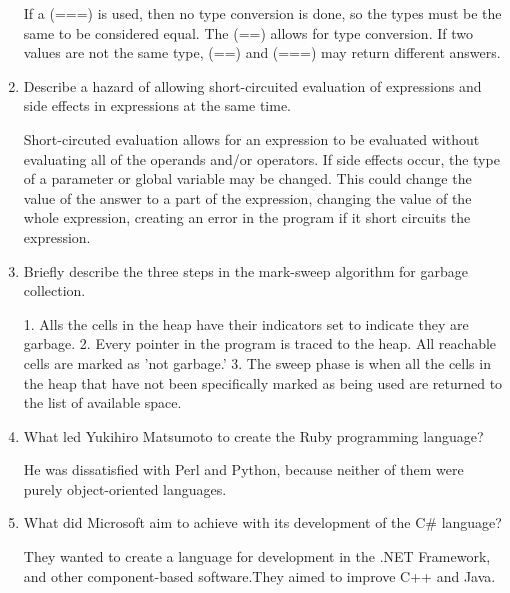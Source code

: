 \begin{enumerate}
  \begin{answer}

    If a (===) is used, then no type conversion is done, so the types
    must be the same to be considered equal. The (==) allows for type
    conversion. If two values are not the same type, (==) and (===)
    may return different answers.

    \end{answer}

  \item Describe a hazard of allowing short-circuited evaluation
    of expressions and side effects in expressions at the same time.

  \begin{answer}

    Short-circuted evaluation allows for an expression to be evaluated
    without evaluating all of the operands and/or operators. If side
    effects occur, the type of a parameter or global variable may be
    changed. This could change the value of the answer to a part of
    the expression, changing the value of the whole expression,
    creating an error in the program if it short circuits the
    expression.

    \end{answer}

  \item Briefly describe the three steps in the mark-sweep algorithm
    for garbage collection.

  \begin{answer}

    1. Alls the cells in the heap have their indicators set to
    indicate they are garbage.  2. Every pointer in the program is
    traced to the heap. All reachable cells are marked as 'not
    garbage.'  3. The sweep phase is when all the cells in the heap
    that have not been specifically marked as being used are returned
    to the list of available space.

    \end{answer}

  \item What led Yukihiro Matsumoto to create the Ruby programming language?

  \begin{answer}

    He was dissatisfied with Perl and Python, because neither of them
    were purely object-oriented languages.

    \end{answer}

  \item What did Microsoft aim to achieve with its development of the
    C\# language?

  \begin{answer}

    They wanted to create a language for development in the .NET
    Framework, and other component-based software.They aimed to
    improve C++ and Java.

    \end{answer}

  \end{enumerate}


